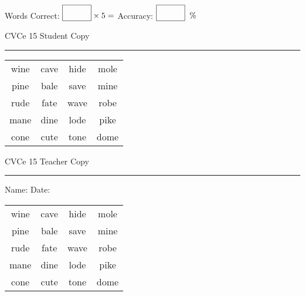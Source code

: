 \documentclass{memoir}
\begin{document}
\small

Words Correct: $\fbox{\phantom{\huge 100}} \times 5 = $ Accuracy: $\fbox{\phantom{\huge 100}}\;\; \%$ 

\vfill

\newpage


\footnotesize \noindent
CVCe 15 \hfill Student Copy
\smallskip
\hrule

\Large

\setlength{\tabcolsep}{14pt}
\def\arraystretch{2}

{\selectfont


\begin{vplace}[0.5]
\begin{center}
\begin{tabular}{cccc}
wine & cave & hide & mole \\
pine & bale & save & mine \\
rude & fate & wave & robe \\
mane & dine & lode & pike \\
cone & cute & tone & dome \\
\end{tabular}
\end{center}
\end{vplace}

}

\newpage

\footnotesize \noindent
CVCe 15 \hfill Teacher Copy
\smallskip
\hrule

\small

\vfill

\noindent
Name: \underline{\hspace{1.75in}} \hfill Date: \underline{\hspace{1in}}

\Large

{\selectfont


\begin{vplace}[0.5]
\begin{center}
\begin{tabular}{cccc}
wine & cave & hide & mole \\
pine & bale & save & mine \\
rude & fate & wave & robe \\
mane & dine & lode & pike \\
cone & cute & tone & dome \\
\end{tabular}
\end{center}
\end{vplace}



}
\end{document}
